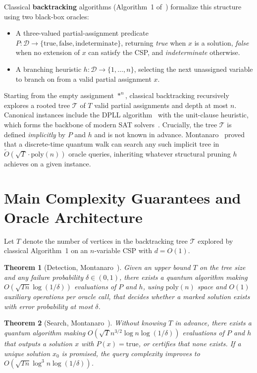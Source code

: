 \documentclass[11pt,a4paper]{article}
\newtheorem{theorem}{Theorem}[section]
\begin{document}
Classical \textbf{backtracking} algorithms (Algorithm~1 of~\cite{montanaro2015}) formalize this structure using two black-box oracles:
\begin{itemize}
    \item A three-valued partial-assignment predicate $P : \mathcal{D} \to \{\text{true}, \text{false}, \text{indeterminate}\}$, returning \emph{true} when $x$ is a solution, \emph{false} when no extension of $x$ can satisfy the CSP, and \emph{indeterminate} otherwise.
    \item A branching heuristic $h : \mathcal{D} \to \{1, \dots, n\}$, selecting the next unassigned variable to branch on from a valid partial assignment $x$.
\end{itemize}
Starting from the empty assignment $*^n$, classical backtracking recursively explores a rooted tree $\mathcal{T}$ of $T$ valid partial assignments and depth at most $n$. Canonical instances include the DPLL algorithm~\cite{davis1960,davis1962} with the unit-clause heuristic, which forms the backbone of modern SAT solvers~\cite{een2003,lynce2003}. Crucially, the tree $\mathcal{T}$ is defined \emph{implicitly} by $P$ and $h$ and is not known in advance. Montanaro~\cite{montanaro2015} proved that a discrete-time quantum walk can search any such implicit tree in $\tilde{O}(\sqrt{T}\cdot \mathrm{poly}(n))$ oracle queries, inheriting whatever structural pruning $h$ achieves on a given instance.

\section{Main Complexity Guarantees and Oracle Architecture}

Let $T$ denote the number of vertices in the backtracking tree $\mathcal{T}$ explored by classical Algorithm~1 on an $n$-variable CSP with $d = O(1)$.

\begin{theorem}[Detection, Montanaro~\cite{montanaro2015}]
Given an upper bound $T$ on the tree size and any failure probability $\delta \in (0, 1)$, there exists a quantum algorithm making $O(\sqrt{Tn}\log(1/\delta))$ evaluations of $P$ and $h$, using $\mathrm{poly}(n)$ space and $O(1)$ auxiliary operations per oracle call, that decides whether a marked solution exists with error probability at most $\delta$.
\end{theorem}

\begin{theorem}[Search, Montanaro~\cite{montanaro2015}]
Without knowing $T$ in advance, there exists a quantum algorithm making $O(\sqrt{T}n^{3/2}\log n \log(1/\delta))$ evaluations of $P$ and $h$ that outputs a solution $x$ with $P(x) = \text{true}$, or certifies that none exists. If a unique solution $x_0$ is promised, the query complexity improves to $O(\sqrt{Tn}\log^3 n \log(1/\delta))$.
\end{theorem}
\end{document}
